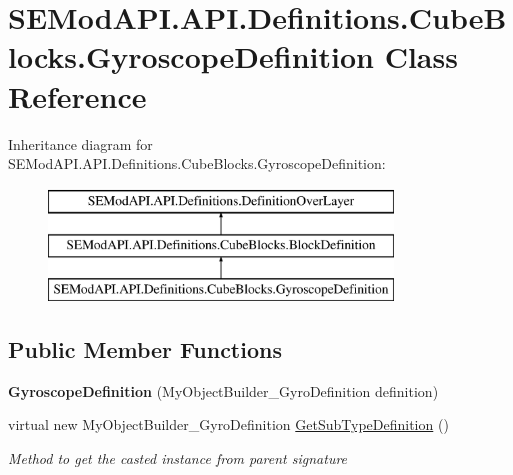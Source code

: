 \hypertarget{class_s_e_mod_a_p_i_1_1_a_p_i_1_1_definitions_1_1_cube_blocks_1_1_gyroscope_definition}{}\section{S\+E\+Mod\+A\+P\+I.\+A\+P\+I.\+Definitions.\+Cube\+Blocks.\+Gyroscope\+Definition Class Reference}
\label{class_s_e_mod_a_p_i_1_1_a_p_i_1_1_definitions_1_1_cube_blocks_1_1_gyroscope_definition}
Inheritance diagram for S\+E\+Mod\+A\+P\+I.\+A\+P\+I.\+Definitions.\+Cube\+Blocks.\+Gyroscope\+Definition\+:\begin{figure}[H]
\begin{center}
\leavevmode
\includegraphics[height=3.000000cm]{class_s_e_mod_a_p_i_1_1_a_p_i_1_1_definitions_1_1_cube_blocks_1_1_gyroscope_definition}
\end{center}
\end{figure}
\subsection*{Public Member Functions}
\begin{DoxyCompactItemize}
\item 
\hypertarget{class_s_e_mod_a_p_i_1_1_a_p_i_1_1_definitions_1_1_cube_blocks_1_1_gyroscope_definition_a7416b0de8f7fbc8dc3b7cefa7eb446f9}{}{\bfseries Gyroscope\+Definition} (My\+Object\+Builder\+\_\+\+Gyro\+Definition definition)\label{class_s_e_mod_a_p_i_1_1_a_p_i_1_1_definitions_1_1_cube_blocks_1_1_gyroscope_definition_a7416b0de8f7fbc8dc3b7cefa7eb446f9}

\item 
virtual new My\+Object\+Builder\+\_\+\+Gyro\+Definition \hyperlink{class_s_e_mod_a_p_i_1_1_a_p_i_1_1_definitions_1_1_cube_blocks_1_1_gyroscope_definition_a51db658bdc60c22402c025002d3dcfa5}{Get\+Sub\+Type\+Definition} ()
\begin{DoxyCompactList}\small\item\em Method to get the casted instance from parent signature \end{DoxyCompactList}\end{DoxyCompactItemize}
